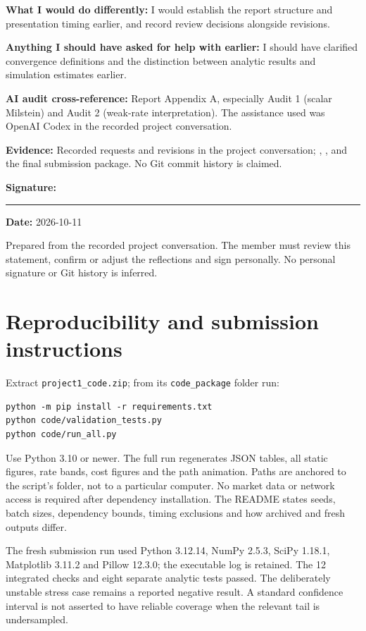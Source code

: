 \textbf{What I would do differently:} I would establish the report structure and presentation timing earlier, and record review decisions alongside revisions.

\textbf{Anything I should have asked for help with earlier:} I should have clarified convergence definitions and the distinction between analytic results and simulation estimates earlier.

\textbf{AI audit cross-reference:} Report Appendix A, especially Audit 1 (scalar Milstein) and Audit 2 (weak-rate interpretation). The assistance used was OpenAI Codex in the recorded project conversation.

\textbf{Evidence:} Recorded requests and revisions in the project conversation; , , and the final submission package. No Git commit history is claimed.

\textbf{Signature:} \rule{5cm}{.3pt} \qquad \textbf{Date:} 2026-10-11

{\small Prepared from the recorded project conversation. The member must review this statement, confirm or adjust the reflections and sign personally. No personal signature or Git history is inferred.}
\clearpage
\section{Reproducibility and submission instructions}
\label{app:reproduce}
Extract \texttt{project1\_code.zip}; from its \texttt{code\_package} folder run:
\begin{lstlisting}[language={},numbers=none]
python -m pip install -r requirements.txt
python code/validation_tests.py
python code/run_all.py
\end{lstlisting}
Use Python 3.10 or newer. The full run regenerates JSON tables, all static figures, rate bands, cost figures and the path animation. Paths are anchored to the script's folder, not to a particular computer. No market data or network access is required after dependency installation. The README states seeds, batch sizes, dependency bounds, timing exclusions and how archived and fresh outputs differ.

The fresh submission run used Python 3.12.14, NumPy 2.5.3, SciPy 1.18.1, Matplotlib 3.11.2 and Pillow 12.3.0; the executable log is retained. The 12 integrated checks and eight separate analytic tests passed. The deliberately unstable stress case remains a reported negative result. A standard confidence interval is not asserted to have reliable coverage when the relevant tail is undersampled.

